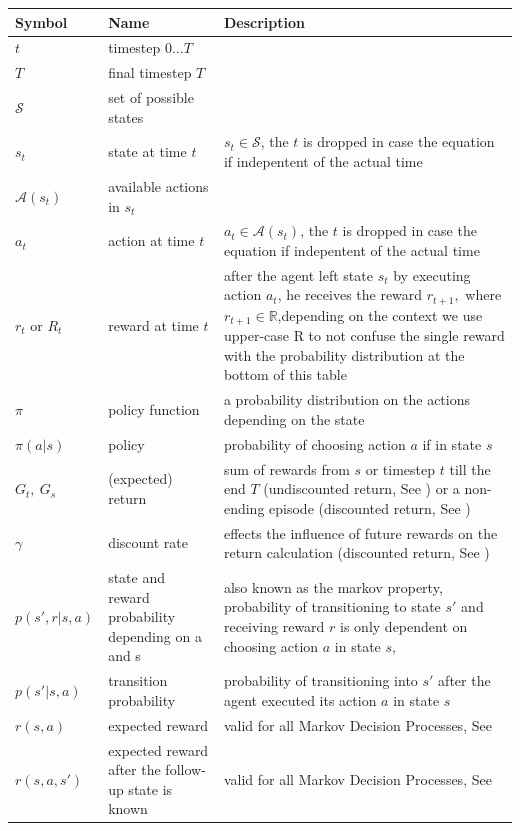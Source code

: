 \documentclass[a4paper,12pt]{scrartcl}
\begin{document}
\begin{tabular}{C{0.1\textwidth}p{0.3\textwidth}p{0.6\textwidth}}
	\toprule
	Symbol & Name &  Description \\
	\midrule
	$t$ & timestep $0 \dots T$ & \\
	$T$ & final timestep $T$ & \\
	$\mathcal{S}$ & set of possible states & \\
	$s_t$ & state at time $t$ &  $s_t \in \mathcal{S}$, the $t$ is dropped in case the equation if indepentent of the actual time\\
	$\mathcal{A}(s_t)$ & available actions in $s_t$ & \\
	$a_t$ & action at time $t$ & $a_t \in \mathcal{A}(s_t)$, the $t$ is dropped in case the equation if indepentent of the actual time \\
	$r_t$ or $R_t$ & reward at time $t$ & after the agent left state $s_t$ by executing action $a_t$, he receives the reward $r_{t+1},$ where $r_{t+1} \in \mathbb{R}$,\newline depending on the context we use upper-case R to not confuse the single reward with the probability distribution at the bottom of this table\\
	$\pi$ & policy function & a probability distribution on the actions depending on the state\\
	$\pi(a\vert s)$ & policy & probability of choosing action $a$ if in state $s$\\
	$G_t,~G_s$ & (expected) return & sum of rewards from $s$ or timestep $t$ till the end $T$ (undiscounted return, See ) or a non-ending episode (discounted return, See )\\
	$\gamma$ & discount rate & effects the influence of future rewards on the return calculation (discounted return, See )\\
	$p(s', r|s,a)$ & state and reward probability depending on a and s & also known as the markov property, probability of transitioning to state $s'$ and receiving reward $r$ is only dependent on choosing action $a$ in state $s$, \newline \\
	$p(s'\vert s,a)$ & transition probability & probability of transitioning into $s'$ after the agent executed its action $a$ in state $s$\\
	$r(s,a)$ & expected reward & valid for all Markov Decision Processes, \newline See  \\
	$r(s,a,s')$ & expected reward after the follow-up state is known& valid for all Markov Decision Processes, \newline See  \\
	\bottomrule
\end{tabular}
\end{document}
